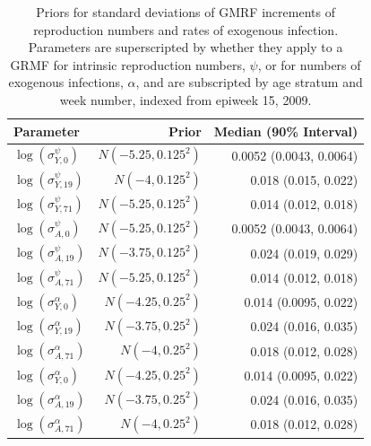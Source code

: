 \begin{table}
	\caption[Priors for standard deviations of GMRF increments of reproduction numbers and rates of exogenous infection.]{Priors for standard deviations of GMRF increments of reproduction numbers and rates of exogenous infection. Parameters are superscripted by whether they apply to a GRMF for intrinsic reproduction numbers, $ \psi $, or for numbers of exogenous infections, $ \alpha $, and are subscripted by age stratum and week number, indexed from epiweek 15, 2009.}
	\label{key}
	\centering
	\begin{tabular}{lrr}
		\hline
		\textbf{Parameter} & \textbf{Prior} & \textbf{Median (90\% Interval)} \\ 
		\hline
		$ \log(\sigma^{\psi}_{Y,0}) $ & $ N(-5.25, 0.125^2) $ & 0.0052 (0.0043, 0.0064)\\
		$ \log(\sigma^{\psi}_{Y,19}) $ & $ N(-4, 0.125^2) $ & 0.018 (0.015, 0.022)\\
		$ \log(\sigma^{\psi}_{Y,71}) $ & $ N(-5.25, 0.125^2) $ & 0.014 (0.012, 0.018)\\
		$ \log(\sigma^{\psi}_{A,0}) $ & $ N(-5.25, 0.125^2) $ & 0.0052 (0.0043, 0.0064)\\
		$ \log(\sigma^{\psi}_{A,19}) $ & $ N(-3.75, 0.125^2) $ & 0.024 (0.019, 0.029)\\
		$ \log(\sigma^{\psi}_{A,71}) $ & $ N(-5.25, 0.125^2) $ & 0.014 (0.012, 0.018)\\
		$ \log(\sigma^{\alpha}_{Y,0}) $ & $ N(-4.25, 0.25^2) $ & 0.014 (0.0095, 0.022)\\
		$ \log(\sigma^{\alpha}_{Y,19}) $ & $ N(-3.75, 0.25^2) $ & 0.024 (0.016, 0.035)\\
		$ \log(\sigma^{\alpha}_{A,71}) $ & $ N(-4, 0.25^2) $ & 0.018 (0.012, 0.028)\\
			$ \log(\sigma^{\alpha}_{Y,0}) $ & $ N(-4.25, 0.25^2) $ & 0.014 (0.0095, 0.022)\\
		$ \log(\sigma^{\alpha}_{A,19}) $ & $ N(-3.75, 0.25^2) $ & 0.024 (0.016, 0.035)\\
		$ \log(\sigma^{\alpha}_{A,71}) $ & $ N(-4, 0.25^2) $ & 0.018 (0.012, 0.028)\\
		\hline
	\end{tabular}
\end{table}

